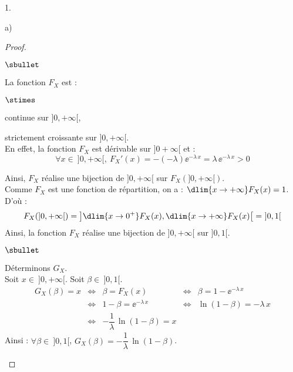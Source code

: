 \begin{noliste}{1.}
\begin{noliste}{a)}
\begin{proof}
\begin{noliste}{$\sbullet$}
	
	\item La fonction $F_X$ est :
	\begin{noliste}{$\stimes$}
	  \item continue sur $]0,+\infty[$,
	  \item strictement croissante sur $]0,+\infty[$.\\
	  En effet, la fonction $F_X$ est dérivable sur 
	  $]0+\infty[$ et :
	  \[
	    \forall x \in \ ]0,+\infty[, \ 
	    F_X'(x) = -(-\lambda) \ee^{-\lambda \, x} = 
	    \lambda \, \ee^{-\lambda \, x} >0
	  \]
	\end{noliste}
	Ainsi, $F_X$ réalise une bijection de $]0,+\infty[$ sur 
	$F_X(]0,+\infty[)$.\\
	Comme $F_X$ est une fonction de répartition, on a :
	$\dlim{x\to +\infty} F_X(x)=1$.\\
	D'où :
	\[
	  F_X(]0,+\infty[) = \left] \dlim{x\to 0^+} F_X(x), 
	  \dlim{x\to +\infty} F_X(x) \right[ = \ ]0,1[
	\]
	Ainsi, la fonction $F_X$ réalise une bijection de 
	$]0,+\infty[$ sur $]0,1[$.
      \end{noliste}
      
      \begin{noliste}{$\sbullet$}
	\item Déterminons $G_X$.\\
	Soit $x \in \ ]0,+\infty[$. Soit $\beta \in \ ]0,1[$.
	\[
	  \begin{array}{rcccl}
	    G_X(\beta) = x & \Leftrightarrow & 
	    \beta = F_X(x) & \Leftrightarrow &
	    \beta = 1-\ee^{-\lambda \, x}
	    \\[.2cm]
	    & \Leftrightarrow & 1-\beta = \ee^{-\lambda \, x}
	    & \Leftrightarrow & \ln(1-\beta) = - \lambda \, x
	    \\[.2cm]
	    & \Leftrightarrow & -\dfrac{1}{\lambda} \, 
	    \ln(1-\beta) = x
	  \end{array}
	\]
	Ainsi : $\forall \beta \in \ ]0,1[$, $G_X(\beta) = 
	-\dfrac{1}{\lambda} \, \ln(1-\beta)$.
	~\\[-1.4cm]
      \end{noliste}
    \end{proof}

  \end{noliste}


\end{noliste}
